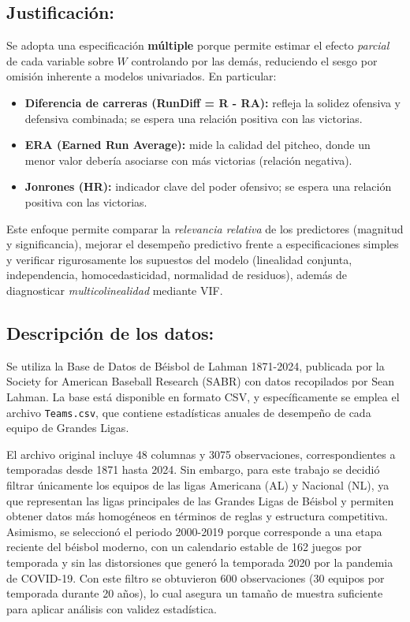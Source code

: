 \documentclass[man,floatsintext]{apa7}
\begin{document}
\subsection{Justificación:}
Se adopta una especificación \textbf{múltiple} porque permite estimar el efecto \emph{parcial} de cada variable sobre $W$ controlando por las demás, reduciendo el sesgo por omisión inherente a modelos univariados. En particular:
\begin{itemize}
    \item \textbf{Diferencia de carreras (RunDiff = R - RA):} refleja la solidez ofensiva y defensiva combinada; se espera una relación positiva con las victorias.
    \item \textbf{ERA (Earned Run Average):} mide la calidad del pitcheo, donde un menor valor debería asociarse con más victorias (relación negativa).
    \item \textbf{Jonrones (HR):} indicador clave del poder ofensivo; se espera una relación positiva con las victorias.
\end{itemize}
Este enfoque permite comparar la \emph{relevancia relativa} de los predictores (magnitud y significancia), mejorar el desempeño predictivo frente a especificaciones simples y verificar rigurosamente los supuestos del modelo (linealidad conjunta, independencia, homocedasticidad, normalidad de residuos), además de diagnosticar \emph{multicolinealidad} mediante VIF.
%
\subsection{Descripción de los datos:}
Se utiliza la Base de Datos de Béisbol de Lahman 1871-2024, publicada por la Society for American Baseball Research (SABR) con datos recopilados por Sean Lahman. La base está disponible en formato CSV, y específicamente se emplea el archivo \texttt{Teams.csv}, que contiene estadísticas anuales de desempeño de cada equipo de Grandes Ligas. 

El archivo original incluye 48 columnas y 3075 observaciones, correspondientes a temporadas desde 1871 hasta 2024. Sin embargo, para este trabajo se decidió filtrar únicamente los equipos de las ligas Americana (AL) y Nacional (NL), ya que representan las ligas principales de las Grandes Ligas de Béisbol y permiten obtener datos más homogéneos en términos de reglas y estructura competitiva. Asimismo, se seleccionó el periodo 2000-2019 porque corresponde a una etapa reciente del béisbol moderno, con un calendario estable de 162 juegos por temporada y sin las distorsiones que generó la temporada 2020 por la pandemia de COVID-19. Con este filtro se obtuvieron 600 observaciones (30 equipos por temporada durante 20 años), lo cual asegura un tamaño de muestra suficiente para aplicar análisis con validez estadística.
\end{document}
